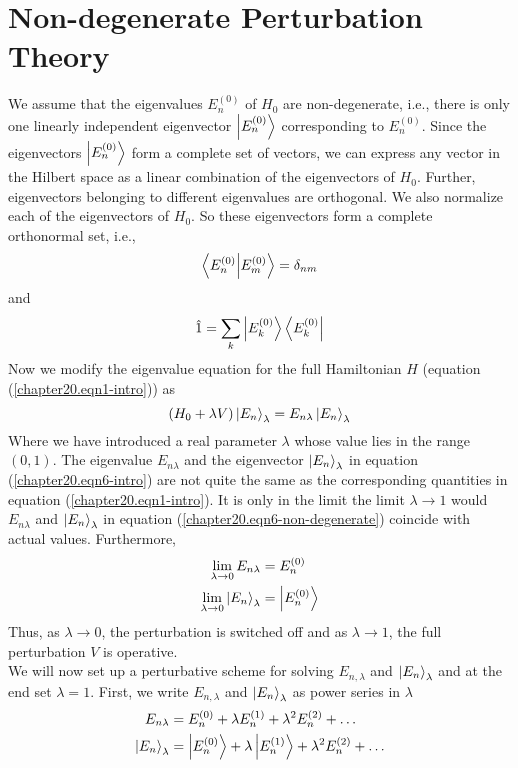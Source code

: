\section{Non-degenerate Perturbation Theory}
We assume that the eigenvalues $E_n^{(0)}$ of $H_0$ are non-degenerate, i.e., there is only one linearly independent eigenvector $\ket{E_n^{(0)}}$ corresponding to $E_n^{(0)}$. Since the eigenvectors $\ket{E_n^{(0)}}$ form a complete set of vectors, we can express any vector in the Hilbert space as a linear combination of the eigenvectors of $H_0$. Further, eigenvectors belonging to different eigenvalues are orthogonal. We also normalize each of the eigenvectors of $H_0$. So these eigenvectors form a complete orthonormal set, i.e.,
\begin{equation}
	\braket{E_n^{(0)}}{E_m^{(0)}} = \delta_{n m}
	\label{chapter20.eqn4-non-degenerate}
\end{equation}
and
\begin{equation}
	\hat{1} = \sum_{k} \ket{E_k^{(0)}} \bra{E_k^{(0)}}
	\label{chapter20.eqn5-non-degenerate}
\end{equation}
Now we modify the eigenvalue equation for the full Hamiltonian $H$ (equation (\ref{chapter20.eqn1-intro})) as
\begin{equation}
	(H_0 + \lambda V) \ket{E_n}_\lambda = E_{n\lambda} \ket{E_n}_\lambda
	\label{chapter20.eqn6-non-degenerate}
\end{equation}
Where we have introduced a real parameter $\lambda$ whose value lies in the range $(0,1)$. The eigenvalue $E_{n \lambda}$ and the eigenvector $\ket{E_n}_\lambda$  in equation (\ref{chapter20.eqn6-intro}) are not quite the same as the corresponding quantities in equation (\ref{chapter20.eqn1-intro}). It is only in the limit the limit $\lambda\rightarrow 1$ would $E_{n\lambda}$ and  $\ket{E_n}_\lambda$ in equation (\ref{chapter20.eqn6-non-degenerate}) coincide with actual values. Furthermore,
\begin{align}
	\lim\limits_{\lambda \rightarrow 0} E_{n \lambda} &= E_n^{(0)} \\
	\lim\limits_{\lambda \rightarrow 0} \ket{E_n}_\lambda &= \ket{E_{n}^{(0)}}
\end{align}
Thus, as $\lambda \rightarrow 0$, the perturbation is switched off and as $\lambda \rightarrow 1$, the full perturbation $V$ is operative.\\

We will now set up a perturbative scheme for solving $E_{n,\lambda}$ and $\ket{E_n}_\lambda$ and at the end set $\lambda = 1$. First, we write $E_{n,\lambda}$ and $\ket{E_n}_\lambda$ as power series in $\lambda$
\begin{align}
\label{chapter20.eqn7-non-degenerate}
E_{n\lambda} &= E_n^{(0)} + \lambda E_n^{(1)} + \lambda^2 E_n^{(2)} + \ldots \\
\label{chapter20.eqn8-non-degenerate}
\ket{E_n}_\lambda &= \ket{E_n^{(0)}} + \lambda \ket{E_n^{(1)}} + \lambda^2 E_n^{(2)} + \ldots
\end{align}

